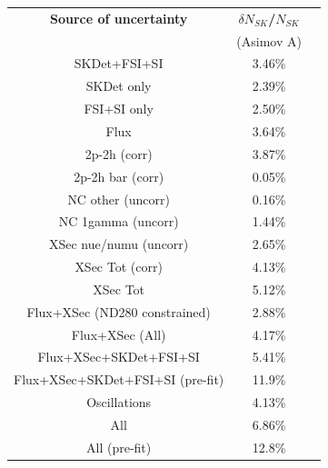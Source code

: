\begin{table}[htb]
\centering
\begin{tabular}{| c | c | c |}
\hline
  {\bf Source of uncertainty}    & \multicolumn{1}{c|}{{\bf ${\delta}N_{SK}$/$N_{SK}$}}\\
                                 & \multicolumn{1}{c|}{(Asimov A)}\\

\hline
\hline  
SKDet+FSI+SI                   & 3.46\%                        \\
SKDet only                   & 2.39\%                        \\
FSI+SI only                   & 2.50\%                        \\
\hline
\hline
  Flux                           & 3.64\%                        \\
\hline
\hline
  2p-2h (corr)                     & 3.87\%                        \\
  2p-2h bar (corr)                  & 0.05\%                        \\
  NC other (uncorr)              & 0.16\%                        \\
  NC 1gamma (uncorr)             & 1.44\%                        \\
  XSec nue/numu (uncorr)                 & 2.65\%                        \\
\hline
  XSec Tot (corr)                  & 4.13\%                        \\
  XSec Tot                       & 5.12\%                        \\
\hline
\hline
  Flux+XSec (ND280 constrained)                      & 2.88\%                        \\
  Flux+XSec  (All)                     & 4.17\%                        \\
\hline
  Flux+XSec+SKDet+FSI+SI         & 5.41\%                        \\
  Flux+XSec+SKDet+FSI+SI (pre-fit)         & 11.9\%                        \\
\hline
\hline
  Oscillations                   & 4.13\%                        \\
\hline
\hline
  All                            & 6.86\%                        \\
  All (pre-fit) 		& 12.8\%				\\
\hline
\hline


\end{tabular}
\end{table}
